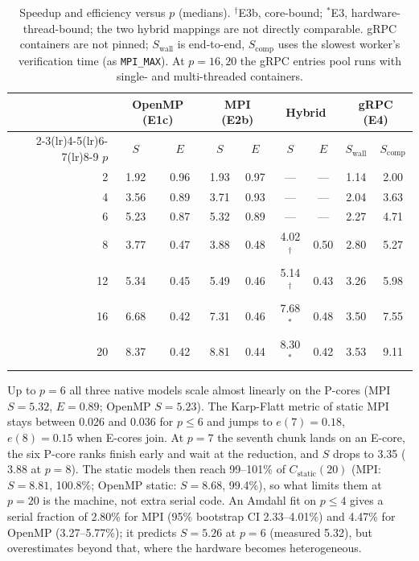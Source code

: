 \documentclass[10pt,a4paper]{article}
\begin{document}
\begin{table}[t]
\centering\small
\setlength{\tabcolsep}{4pt}
\begin{tabular}{rcccccccc}
\toprule
& \multicolumn{2}{c}{\textbf{OpenMP (E1c)}} & \multicolumn{2}{c}{\textbf{MPI (E2b)}} & \multicolumn{2}{c}{\textbf{Hybrid}} & \multicolumn{2}{c}{\textbf{gRPC (E4)}} \\
\cmidrule(lr){2-3}\cmidrule(lr){4-5}\cmidrule(lr){6-7}\cmidrule(lr){8-9}
$p$ & $S$ & $E$ & $S$ & $E$ & $S$ & $E$ & $S_{\mathrm{wall}}$ & $S_{\mathrm{comp}}$ \\
\midrule
2  & 1.92 & 0.96 & 1.93 & 0.97 & --- & --- & 1.14 & 2.00 \\
4  & 3.56 & 0.89 & 3.71 & 0.93 & --- & --- & 2.04 & 3.63 \\
6  & 5.23 & 0.87 & 5.32 & 0.89 & --- & --- & 2.27 & 4.71 \\
8  & 3.77 & 0.47 & 3.88 & 0.48 & 4.02$^\dagger$ & 0.50 & 2.80 & 5.27 \\
12 & 5.34 & 0.45 & 5.49 & 0.46 & 5.14$^\dagger$ & 0.43 & 3.26 & 5.98 \\
16 & 6.68 & 0.42 & 7.31 & 0.46 & 7.68$^*$ & 0.48 & 3.50 & 7.55 \\
20 & 8.37 & 0.42 & 8.81 & 0.44 & 8.30$^*$ & 0.42 & 3.53 & 9.11 \\
\bottomrule
\end{tabular}
\caption{Speedup and efficiency versus $p$ (medians). $^\dagger$E3b, core-bound; $^*$E3, hardware-thread-bound; the two hybrid mappings are not directly comparable. gRPC containers are not pinned; $S_{\mathrm{wall}}$ is end-to-end, $S_{\mathrm{comp}}$ uses the slowest worker's verification time (as \texttt{MPI\_MAX}). At $p=16,20$ the gRPC entries pool runs with single- and multi-threaded containers.}
\label{tab:speedup}
\end{table}

Up to $p=6$ all three native models scale almost linearly on the P-cores (MPI $S=5.32$, $E=0.89$; OpenMP $S=5.23$). The Karp-Flatt metric of static MPI stays between 0.026 and 0.036 for $p\le6$ and jumps to $e(7)=0.18$, $e(8)=0.15$ when E-cores join. At $p=7$ the seventh chunk lands on an E-core, the six P-core ranks finish early and wait at the reduction, and $S$ drops to 3.35 ($3.88$ at $p=8$). The static models then reach 99--101\% of $C_{\mathrm{static}}(20)$ (MPI: $S=8.81$, 100.8\%; OpenMP static: $S=8.68$, 99.4\%), so what limits them at $p=20$ is the machine, not extra serial code. An Amdahl fit on $p\le4$ gives a serial fraction of 2.80\% for MPI (95\% bootstrap CI 2.33--4.01\%) and 4.47\% for OpenMP (3.27--5.77\%); it predicts $S=5.26$ at $p=6$ (measured 5.32), but overestimates beyond that, where the hardware becomes heterogeneous.
\end{document}
